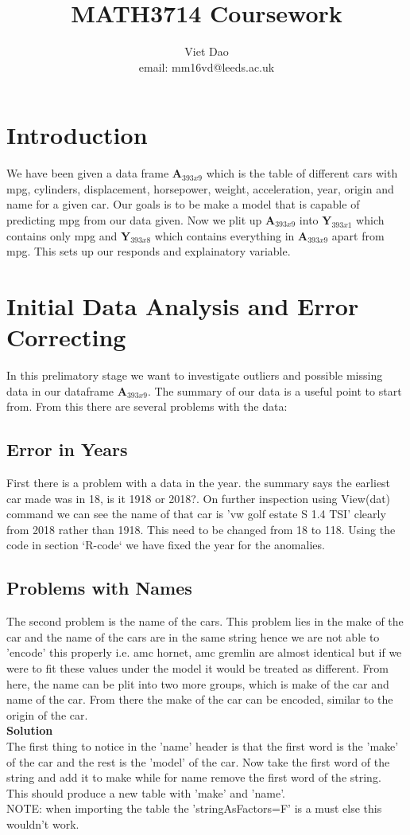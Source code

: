 \documentclass[11pt]{article} %
\title{MATH3714 Coursework}
\author{Viet Dao\\email: mm16vd@leeds.ac.uk}
\begin{document}
\maketitle
\newpage
\tableofcontents
\newpage

\section{Introduction}
We have been given a data frame $\textbf{A}_{393x9}$ which is the table of different cars with mpg, cylinders, displacement, horsepower, weight, acceleration, year, origin and name for a given car. Our goals is to be make a model that is capable of predicting mpg from our data given. Now we plit up $\textbf{A}_{393x9}$ into $\textbf{Y}_{393x1}$ which contains only mpg and $\textbf{Y}_{393x8}$ which contains everything in $\textbf{A}_{393x9}$ apart from mpg. This sets up our responds and explainatory variable.

\section{Initial Data Analysis and Error Correcting}
In this prelimatory stage we want to investigate outliers and possible missing data in our dataframe $\textbf{A}_{393x9}$. The summary of our data is a useful point to start from. From this there are several problems with the data:
\subsection{Error in Years}
First there is a problem with a data in the year. the summary says the earliest car made was in 18, is it 1918 or 2018?. On further inspection using View(dat) command we can see the name of that car is 'vw golf estate S 1.4 TSI' clearly from 2018 rather than 1918. This need to be changed from 18 to 118. Using the code in section `R-code` we have fixed the year for the anomalies.

\subsection{Problems with Names}
The second problem is the name of the cars. This problem lies in the make of the car and the name of the cars are in the same string hence we are not able to 'encode' this properly i.e. amc hornet, amc gremlin are almost identical but if we were to fit these values under the model it would be treated as different. From here, the name can be plit into two more groups, which is make of the car and name of the car. From there the make of the car can be encoded, similar to the origin of the car.\\
\textbf{Solution}\\
The first thing to notice in the 'name' header is that the first word is the 'make' of the car and the rest is the 'model' of the car. Now take the first word of the string and add it to make while for name remove the first word of the string.\\
This should produce a new table with 'make' and 'name'.\\
NOTE: when importing the table the 'stringAsFactors=F' is a must else this wouldn't work.
\end{document}
